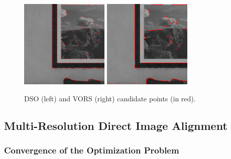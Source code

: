 \begin{figure}[t]
	\centering
	\includegraphics[width=0.49\linewidth]{assets/img/candidates-icl-dso-cropped.png}
	\hfill
	\includegraphics[width=0.49\linewidth]{assets/img/candidates-icl-vors-cropped.png}
	\caption{DSO (left) and VORS (right) candidate points (in red).}%
	\label{fig:candidates-dso-vors}
\end{figure}

\subsection{Multi-Resolution Direct Image Alignment}%
\label{sub:multi-res-direct-image-alignment}

\subsubsection{Convergence of the Optimization Problem}%
\label{ssub:convergence-optimization}


